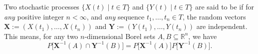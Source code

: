 \documentclass[12pt]{article}
\begin{document}
Two stochastic processes $\lbrace X(t)\mid t\in T \rbrace$ and
$\lbrace Y(t)\mid t\in T \rbrace$ are said to be \emph{}
if for \emph{any} positive integer $n<\infty$, and \emph{any}
sequence $t_1,\ldots,t_n\in T$, the random vectors
$\boldsymbol{X}:=(X(t_1),\ldots,X(t_n))$ and
$\boldsymbol{Y}:=(Y(t_1),\ldots,Y(t_n))$ are independent.  This means,
for any two $n$-dimensional Borel sets $A,B\subseteq\mathbb{R}^n$,
we have
$$P\Big[\boldsymbol{X}^{-1}(A)\cap\boldsymbol{Y}^{-1}(B)\Big]
=P\Big[\boldsymbol{X}^{-1}(A)\Big]P\Big[\boldsymbol{Y}^{-1}(B)\Big].$$
\end{document}
